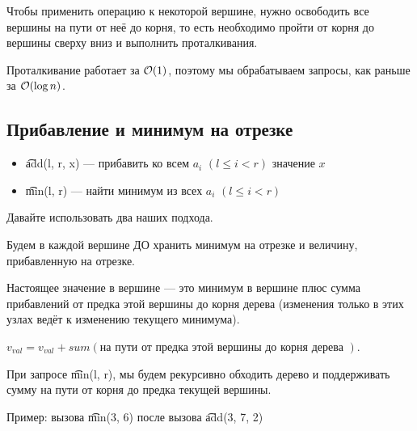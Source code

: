 Чтобы применить операцию к некоторой вершине, нужно освободить все вершины на пути от неё до корня, то есть необходимо пройти от корня до вершины сверху вниз и выполнить проталкивания.

Проталкивание работает за $\mathcal{O}(1)$, поэтому мы обрабатываем запросы, как раньше за $\mathcal{O}(\log n)$.

\subsection{Прибавление и минимум на отрезке}

\begin{itemize}
	\item \t{add(l, r, x)} --- прибавить ко всем $a_i$ $(l \le i < r)$ значение $x$
	\item \t{min(l, r)} --- найти минимум из всех $a_i$ $(l \le i < r)$
\end{itemize}
\up \up

Давайте использовать два наших подхода. 

Будем в каждой вершине ДО хранить минимум на отрезке и величину, прибавленную на отрезке.

Настоящее значение в вершине --- это минимум в вершине плюс сумма прибавлений от предка этой вершины до корня дерева (изменения только в этих узлах ведёт к изменению текущего минимума). 

$v_{val} = v_{val} + sum(\text{на пути от предка этой вершины до корня дерева })$.
\down


При запросе \t{min(l, r)}, мы будем рекурсивно обходить дерево и поддерживать сумму на пути от корня до предка текущей вершины. 

\pagebreak

Пример: вызова \t{min(3, 6)} после вызова \t{add(3, 7, 2)}

\up \up
\begin{center}
	\begin{figure}[h]
	\end{figure}
\end{center}

